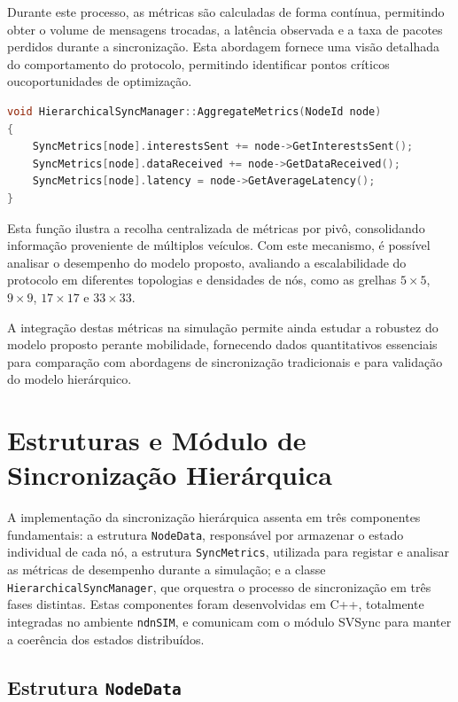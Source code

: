 Durante este processo, as métricas são calculadas de forma contínua, permitindo obter o volume de mensagens trocadas, a latência observada e a taxa de pacotes perdidos durante a sincronização. Esta abordagem fornece uma visão detalhada do comportamento do protocolo, permitindo identificar pontos críticos oucoportunidades de optimização.

\begin{lstlisting}[language=C++]
void HierarchicalSyncManager::AggregateMetrics(NodeId node)
{
    SyncMetrics[node].interestsSent += node->GetInterestsSent();
    SyncMetrics[node].dataReceived += node->GetDataReceived();
    SyncMetrics[node].latency = node->GetAverageLatency();
}
\end{lstlisting}

Esta função ilustra a recolha centralizada de métricas por pivô, consolidando informação proveniente de múltiplos veículos. Com este mecanismo, é possível analisar o desempenho do modelo proposto, avaliando a escalabilidade do protocolo em diferentes topologias e densidades de nós, como as grelhas $5\times5$, $9\times9$, $17\times17$ e $33\times33$.

A integração destas métricas na simulação permite ainda estudar a robustez do modelo proposto perante mobilidade, fornecendo dados quantitativos essenciais para comparação com abordagens de sincronização tradicionais e para validação do modelo hierárquico.

\section{Estruturas e Módulo de Sincronização Hierárquica}

A implementação da sincronização hierárquica assenta em três componentes fundamentais: a estrutura \texttt{NodeData}, responsável por armazenar o estado individual de cada nó, a estrutura \texttt{SyncMetrics}, utilizada para registar e analisar as métricas de desempenho durante a simulação; e a classe \texttt{Hierarchical\allowbreak Sync\allowbreak Manager}, que orquestra o processo de sincronização em três fases distintas. Estas componentes foram desenvolvidas em C++, totalmente integradas no ambiente \texttt{ndnSIM}, e comunicam com o módulo \gls{SVSync} para manter a coerência dos estados distribuídos.

\subsection{Estrutura \texttt{NodeData}}


